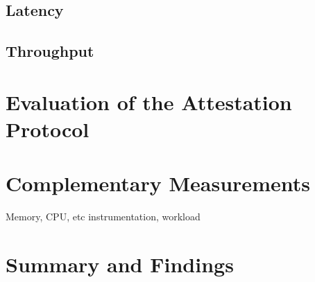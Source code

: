 \subsection{Latency}
\label{ssec:testbench_2_latency}

\subsection{Throughput}
\label{ssec:testbench_2_throughput}

\section{Evaluation of the Attestation Protocol}
\label{sec:evaluation_attestation_protocol}

\section{Complementary Measurements}
\label{sec:complementary_measurements}

Memory, CPU, etc instrumentation, workload

\section{ Summary and Findings}
\label{sec:summary_and_findings}

